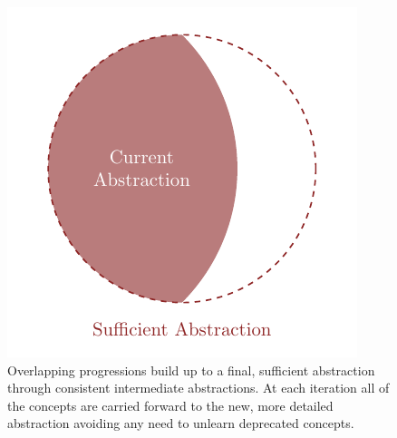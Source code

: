 \documentclass[
  letterpaper,
  DIV=11,
  numbers=noendperiod]{scrartcl}
\begin{document}
\begin{figure}
\begin{minipage}[t]{0.33\linewidth}
{{\includegraphics{figures/pedagogical_abstractions/consistent/2/2.pdf}

}

}

\subcaption{\label{fig-abs-cons2}}
\end{minipage}%
%
\begin{minipage}[t]{0.33\linewidth}

{\centering 


}

\subcaption{\label{fig-abs-cons3}}
\end{minipage}%

\caption{\label{fig-abs-cons}Overlapping progressions build up to a
final, sufficient abstraction through consistent intermediate
abstractions. At each iteration all of the concepts are carried forward
to the new, more detailed abstraction avoiding any need to unlearn
deprecated concepts.}

\end{figure}
\end{document}

